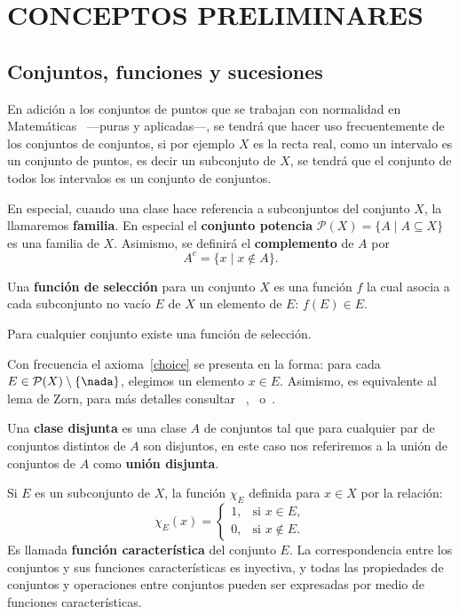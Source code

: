\chapter{CONCEPTOS PRELIMINARES}

\section{Conjuntos, funciones y sucesiones}

En adición a los conjuntos de puntos que se trabajan con normalidad
en Matemáticas ~---puras y aplicadas---, se tendrá que hacer uso
frecuentemente de los conjuntos de conjuntos, si por ejemplo $X$ es
la recta real, como un intervalo es un conjunto de puntos, es decir
un subconjuto de $X$, se tendrá que el conjunto de todos los
intervalos es un conjunto de conjuntos.

En especial, cuando una clase hace referencia a subconjuntos del
conjunto $X$, la llamaremos \textbf{familia}. En especial el
\textbf{conjunto potencia} $\mathcal{P} (X)=\{A\mid A\subseteq X\}$
es una familia de $X$. Asimismo, se definirá el \textbf{complemento}
de $A$ por \[A^c=\{x\mid x\notin A\}.\]

\begin{defn}\label{dfcp28} Una \textbf{función de selección}
para un conjunto $X$ es una función $f$ la cual asocia a cada
subconjunto no vacío $E$ de $X$ un elemento de $E$: $f(E)\in E$.
\end{defn}

\begin{axm}[de selección]\label{choice} Para cualquier conjunto
existe una función de selección.
\end{axm}

\begin{rem} Con frecuencia el axioma~\ref{choice} se presenta en
la forma: para cada $E\in \mathcal{P}(X)\setminus\{\nada\}$,
elegimos un elemento $x\in E$. Asimismo, es equivalente al lema de
Zorn, para más detalles consultar
~\cite[p. 97]{Halmo},~\cite[p. 338]{Haus} o~\cite[p. 14]{Hewit}.
\end{rem}

Una \textbf{clase disjunta} es una clase {\boldmath $A$} de
conjuntos tal que para cualquier par de conjuntos distintos de
{\boldmath $A$} son disjuntos, en este caso nos referiremos a la
unión de conjuntos de {\boldmath $A$} como \textbf{unión disjunta}.

Si $E$ es un subconjunto de $X$, la función $\chi _E$ definida para
$x\in X$ por la relación:
\begin{equation}\label{eq0}
    \chi_E(x)= \begin{cases}
    1, & \mbox{si } x\in E, \\
    0, & \mbox{si } x\notin E.
    \end{cases}
\end{equation}Es llamada \textbf{función característica}
del conjunto $E$. La correspondencia entre los conjuntos y sus
funciones características es inyectiva, y todas las propiedades de
conjuntos y operaciones entre conjuntos pueden ser expresadas por
medio de funciones características. 

